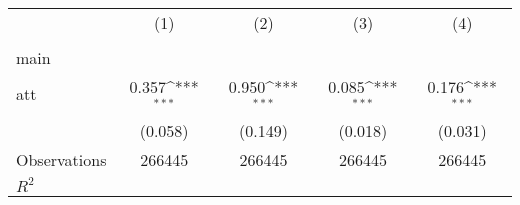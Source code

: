 {
\def\sym#1{\ifmmode^{#1}\else\(^{#1}\)\fi}
\begin{tabular}{l*{4}{c}}
\hline\hline
                    &\multicolumn{1}{c}{(1)}&\multicolumn{1}{c}{(2)}&\multicolumn{1}{c}{(3)}&\multicolumn{1}{c}{(4)}\\
                    &\multicolumn{1}{c}{} &\multicolumn{1}{c}{} &\multicolumn{1}{c}{} &\multicolumn{1}{c}{} \\
\hline
main                &                     &                     &                     &                     \\
att                 &       0.357\sym{***}&       0.950\sym{***}&       0.085\sym{***}&       0.176\sym{***}\\
                    &     (0.058)         &     (0.149)         &     (0.018)         &     (0.031)         \\
\hline
Observations        &      266445         &      266445         &      266445         &      266445         \\
\(R^{2}\)           &                     &                     &                     &                     \\
\hline\hline
\end{tabular}
}
